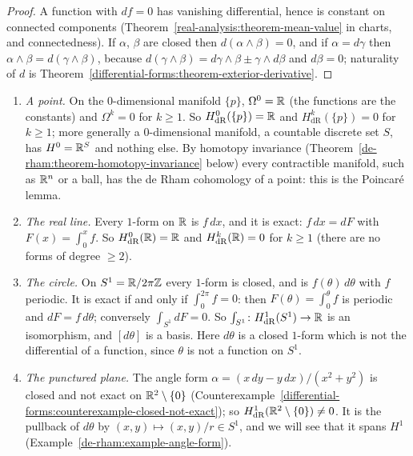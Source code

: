 \begin{proof}
A function with $df = 0$ has vanishing differential, hence is constant on connected components (Theorem~\ref{real-analysis:theorem-mean-value} in charts, and connectedness). If $\alpha$, $\beta$ are closed then
$d(\alpha \wedge \beta) = 0$, and if $\alpha = d\gamma$ then $\alpha \wedge \beta = d(\gamma \wedge \beta)$, because $d(\gamma \wedge \beta) = d\gamma \wedge \beta \pm \gamma \wedge d\beta$ and $d\beta = 0$; naturality of $d$ is
Theorem~\ref{differential-forms:theorem-exterior-derivative}.
\end{proof}

\begin{example}\label{de-rham:example-first-computations}
\begin{enumerate}
\item \emph{A point.} On the $0$-dimensional manifold $\{p\}$, $\Omega^0 = \mathbb{R}$ (the functions are the constants) and $\Omega^k = 0$ for $k \geq 1$. So $H^0_{\mathrm{dR}}(\{p\}) = \mathbb{R}$ and
$H^k_{\mathrm{dR}}(\{p\}) = 0$ for $k \geq 1$; more generally a $0$-dimensional manifold, a countable discrete set $S$, has $H^0 = \mathbb{R}^S$ and nothing else. By homotopy invariance
(Theorem~\ref{de-rham:theorem-homotopy-invariance} below) every contractible manifold, such as $\mathbb{R}^n$ or a ball, has the de Rham cohomology of a point: this is the Poincar\'e lemma.
\item \emph{The real line.} Every $1$-form on $\mathbb{R}$ is $f\,dx$, and it is exact: $f\,dx = dF$ with $F(x) = \int_0^xf$. So $H^0_{\mathrm{dR}}(\mathbb{R}) = \mathbb{R}$ and $H^k_{\mathrm{dR}}(\mathbb{R}) = 0$ for
$k \geq 1$ (there are no forms of degree $\geq 2$).
\item \emph{The circle.} On $S^1 = \mathbb{R}/2\pi\mathbb{Z}$ every $1$-form is closed, and is $f(\theta)\,d\theta$ with $f$ periodic. It is exact if and only if $\int_0^{2\pi}f = 0$: then
$F(\theta) = \int_0^\theta f$ is periodic and $dF = f\,d\theta$; conversely $\int_{S^1}dF = 0$. So $\int_{S^1} \colon H^1_{\mathrm{dR}}(S^1) \to \mathbb{R}$ is an isomorphism, and $[d\theta]$ is a basis.
Here $d\theta$ is a closed $1$-form which is not the differential of a function, since $\theta$ is not a function on $S^1$.
\item \emph{The punctured plane.} The angle form $\alpha = (x\,dy - y\,dx)/(x^2 + y^2)$ is closed and not exact on $\mathbb{R}^2 \setminus \{0\}$
(Counterexample~\ref{differential-forms:counterexample-closed-not-exact}); so $H^1_{\mathrm{dR}}(\mathbb{R}^2 \setminus \{0\}) \neq 0$. It is the pullback of $d\theta$ by
$(x, y) \mapsto (x, y)/r \in S^1$, and we will see that it spans $H^1$ (Example~\ref{de-rham:example-angle-form}).
\end{enumerate}
\end{example}

